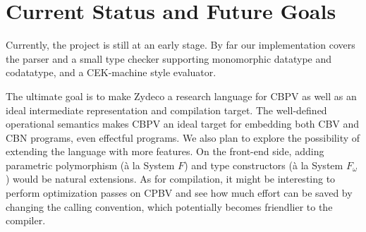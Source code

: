 \documentclass[acmsmall,nonacm]{acmart}
\begin{document}
\section{Current Status and Future Goals}

Currently, the project is still at an early stage. By far our implementation covers the parser and a small type checker supporting monomorphic datatype and codatatype, and a CEK-machine style evaluator.

The ultimate goal is to make Zydeco a research language for CBPV as well as an ideal intermediate representation and compilation target. The well-defined operational semantics makes CBPV an ideal target for embedding both CBV and CBN programs, even effectful programs. We also plan to explore the possibility of extending the language with more features. On the front-end side, adding parametric polymorphism (à la System $F$) and type constructors (à la System $F_\omega$) would be natural extensions. As for compilation, it might be interesting to perform optimization passes on CPBV and see how much effort can be saved by changing the calling convention, which potentially becomes friendlier to the compiler.
\end{document}

